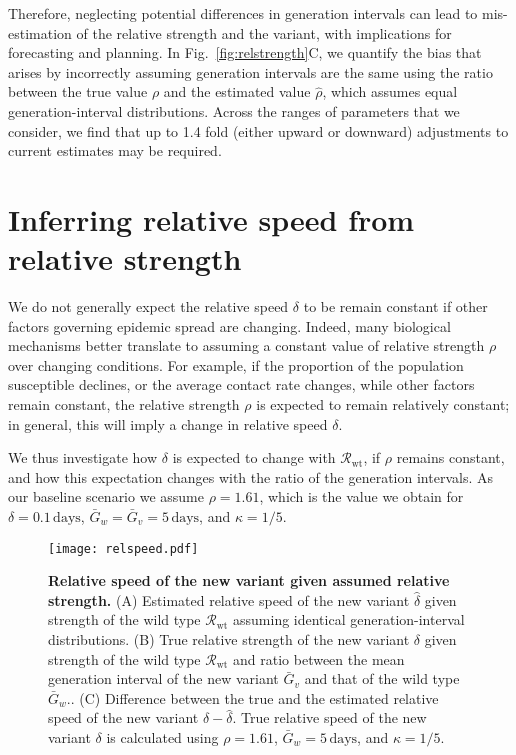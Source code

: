 \documentclass[12pt]{article}
\newcommand{\fref}[1]{Fig.~\ref{fig:#1}}
\newcommand{\wwwt}{\mathrm{wt}}
\newcommand{\Rx}[1]{\ensuremath{{\mathcal R}_{#1}}\xspace}
\newcommand{\Rw}{\Rx{\wwwt}}
\begin{document}
Therefore, neglecting potential differences in generation intervals can lead to mis-estimation of the relative strength and the variant, with implications for forecasting and planning.
In \fref{relstrength}C, we quantify the bias that arises by incorrectly assuming generation intervals are the same using the ratio between the true value $\rho$ and the estimated value $\hat{\rho}$, which assumes equal generation-interval distributions.
Across the ranges of parameters that we consider, we find that up to 1.4 fold (either upward or downward) adjustments to current estimates may be required.

\section{Inferring relative speed from relative strength}

We do not generally expect the relative speed $\delta$ to be remain constant if other factors governing epidemic spread are changing.
Indeed, many biological mechanisms better translate to assuming a constant value of relative strength $\rho$ over changing conditions.
For example, if the proportion of the population susceptible declines, or the average contact rate changes, while other factors remain constant, the relative strength $\rho$ is expected to remain relatively constant; in general, this will imply a change in relative speed $\delta$.

We thus investigate how $\delta$ is expected to change with \Rw, if $\rho$ remains constant, and how this expectation changes with the ratio of the generation intervals. As our baseline scenario we assume $\rho = 1.61$, which is the value we obtain for $\delta=0.1\,\textrm{days}$, $\bar{G}_w = \bar{G}_v = 5\,\textrm{days}$, and $\kappa = 1/5$.

\begin{figure}[!th]
\texttt{[image: relspeed.pdf]}
\caption{
\textbf{Relative speed of the new variant given assumed relative strength.}
(A) Estimated relative speed of the new variant $\hat{\delta}$ given strength of the wild type $\Rw$ assuming identical generation-interval distributions.
(B) True relative strength of the new variant $\delta$ given strength of the wild type $\Rw$ and ratio between the mean generation interval of the new variant $\bar{G}_v$ and that of the wild type $\bar{G}_w$..
(C) Difference between the true and the estimated relative speed of the new variant $\delta - \hat{\delta}$.
True relative speed of the new variant $\delta$ is calculated using $\rho=1.61$, $\bar{G}_w = 5\,\textrm{days}$, and $\kappa=1/5$.
}
\label{fig:relspeed}
\end{figure}
\end{document}
